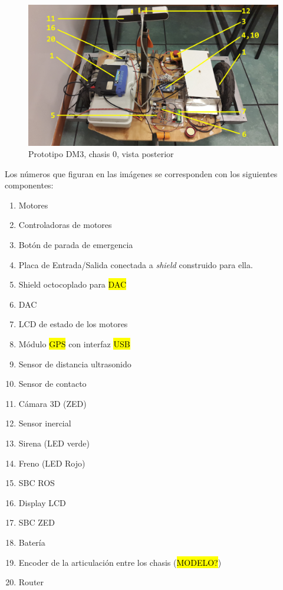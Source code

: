 \documentclass[withindex,glossary]{cam-thesis}
\begin{document}
\begin{figure}[H]
  \centering
  \begin{minipage}[b]{0.49\textwidth}
    \includegraphics[width=\textwidth]{images/Robot3}
    \caption[Prototipo DM3, chasis 0, vista posterior]{Prototipo DM3, chasis 0, vista posterior}
    \label{fig:PrototipoDM33}
  \end{minipage}
\end{figure}

Los números que figuran en las imágenes se corresponden con los siguientes componentes:
\begin{enumerate}[noitemsep]
  \item Motores
  \item Controladoras de motores
  \item Botón de parada de emergencia
  \item Placa de Entrada/Salida conectada a \textit{shield} construido para ella.
  \item Shield octocoplado para \hl{DAC}
  \item DAC
  \item LCD de estado de los motores \cite{LCD1602}
  \item Módulo \hl{GPS} con interfaz \hl{USB} \cite{GPSModule}
  \item Sensor de distancia ultrasonido
  \item Sensor de contacto
  \item Cámara 3D (ZED)
  \item Sensor inercial \cite{myAHRS}
  \item Sirena (LED verde)
  \item Freno (LED Rojo)
  \item SBC ROS
  \item Display LCD
  \item SBC ZED
  \item Batería
  \item Encoder de la articulación entre los chasis (\hl{MODELO?})
  \item Router
\end{enumerate}
\end{document}
